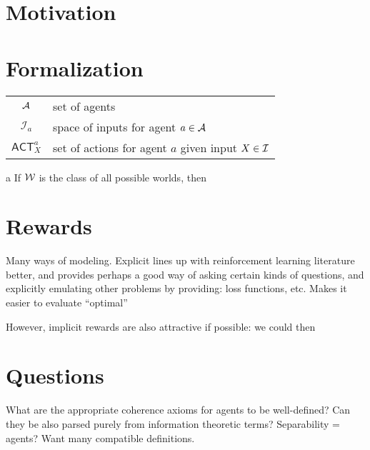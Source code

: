 \documentclass{article}
\begin{document}
	\section{Motivation}

	
	
	\section{Formalization}
	
	\begin{tabular}{cl}
		$\cal A$ & set of agents \\ 
		$\mathcal I_{a}$ & space of inputs for agent $a \in \cal A$\\
		$\mathsf{ACT}^a_{X}$ & set of actions for agent $a$ given input $X \in \cal I$ \\
	\end{tabular}


	
	
	a
	If $\cal W$ is the class of all possible worlds, then 
	
	
	\section{Rewards}
	Many ways of modeling. Explicit lines up with reinforcement learning literature better, and provides perhaps a good way of asking certain kinds of questions, and explicitly emulating other problems by providing: loss functions, etc.  Makes it easier to evaluate ``optimal''
	
	However, implicit rewards are also attractive if possible: we could then 
	
	
	\section{Questions}
	What are the appropriate coherence axioms for agents to be well-defined? Can they be also parsed purely from information theoretic terms? Separability = agents? Want many compatible definitions.
	
\end{document}
